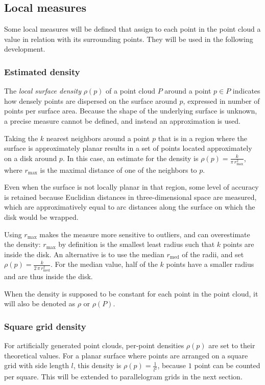 \subsection{Local measures}
Some local measures will be defined that assign to each point in the point cloud a value in relation with its surrounding points. They will be used in the following development.

\subsubsection{Estimated density}
The \emph{local surface density} $\rho(p)$ of a point cloud $P$ around a point $p \in P$ indicates how densely points are dispersed on the surface around $p$, expressed in number of points per surface area. Because the shape of the underlying surface is unknown, a precise measure cannot be defined, and instead an approximation is used.

Taking the $k$ nearest neighbors around a point $p$ that is in a region where the surface is approximately planar results in a set of points located approximately on a disk around $p$. In this case, an estimate for the density is $\rho(p) = \frac{k}{\pi \, r_{\text{max}}^2}$, where $r_{\text{max}}$ is the maximal distance of one of the neighbors to $p$.

Even when the surface is not locally planar in that region, some level of accuracy is retained because Euclidian distances in three-dimensional space are measured, which are approximatively equal to arc distances along the surface on which the disk would be wrapped.

Using $r_{\text{max}}$ makes the measure more sensitive to outliers, and can overestimate the density: $r_{\text{max}}$ by definition is the smallest least radius such that $k$ points are inside the disk. An alternative is to use the median $r_{\text{med}}$ of the radii, and set $\rho(p) = \frac{k}{2 \, \pi \, r_{\text{med}}^2}$. For the median value, half of the $k$ points have a smaller radius and are thus inside the disk.

When the density is supposed to be constant for each point in the point cloud, it will also be denoted as $\rho$ or $\rho(P)$.

\subsubsection{Square grid density}
For artificially generated point clouds, per-point densities $\rho(p)$ are set to their theoretical values. For a planar surface where points are arranged on a square grid with side length $l$, this density is $\rho(p) = \frac{1}{l^2}$, because $1$ point can be counted per square. This will be extended to parallelogram grids in the next section.


